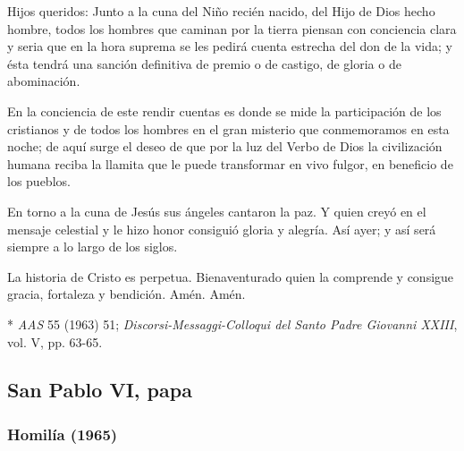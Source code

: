 \begin{body}
	Hijos queridos: Junto a la cuna del Niño recién nacido, del Hijo de Dios hecho hombre, todos los hombres que caminan por la tierra piensan con conciencia clara y seria que en la hora suprema se les pedirá cuenta estrecha del don de la vida; y ésta tendrá una sanción definitiva de premio o de castigo, de gloria o de abominación.
	
	En la conciencia de este rendir cuentas es donde se mide la participación de los cristianos y de todos los hombres en el gran misterio que conmemoramos en esta noche; de aquí surge el deseo de que por la luz del Verbo de Dios la civilización humana reciba la llamita que le puede transformar en vivo fulgor, en beneficio de los pueblos.
	
	En torno a la cuna de Jesús sus ángeles cantaron la paz. Y quien creyó en el mensaje celestial y le hizo honor consiguió gloria y alegría. Así ayer; y así será siempre a lo largo de los siglos.
	
	La historia de Cristo es perpetua. Bienaventurado quien la comprende y consigue gracia, fortaleza y bendición. Amén. Amén.
	
	*\emph{ AAS} 55 (1963) 51; \emph{Discorsi-Messaggi-Colloqui del Santo Padre Giovanni XXIII}, vol. V, pp. 63-65.
\end{body}

\newsection			


\subsection{San Pablo VI, papa}

\subsubsection{Homilía (1965)} 


